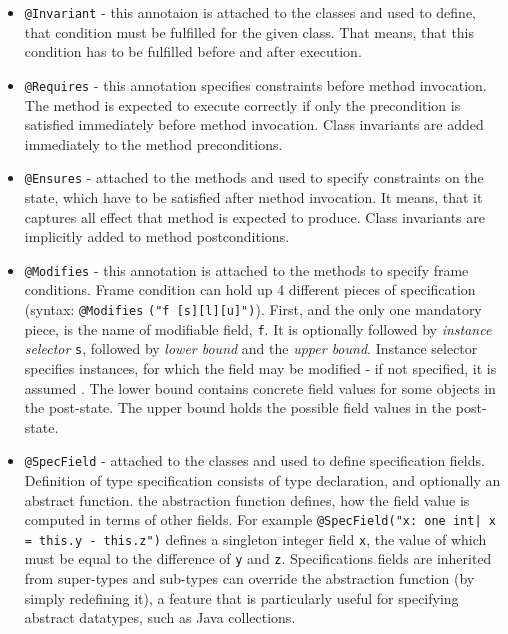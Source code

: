\documentclass[11pt,twoside,a4paper]{book}
\begin{document}
\begin{itemize}
  \item \verb|@Invariant| - this annotaion is attached to the classes and used
  to define, that condition must be fulfilled for the given class. That means,
  that this condition has to be fulfilled before and after execution.
  
  \item \verb|@Requires| -  this annotation specifies constraints before method
  invocation. The method is expected to execute correctly if only the
  precondition is satisfied immediately before method invocation. Class
  invariants are added immediately to the method preconditions.
  \newpage
  \item \verb|@Ensures| - attached to the methods and used to specify
  constraints on the state, which have to be satisfied after method invocation.
  It means, that it captures all effect that method is expected to produce.
  Class invariants are implicitly added to method postconditions.
  
  \item  \verb|@Modifies| - this annotation is attached to the methods to
  specify frame conditions. Frame condition can hold up 4 different pieces of
  specification (syntax: \verb|@Modifies| \verb|("f [s][l][u]")|). First, and
  the only one mandatory piece, is the name of modifiable field, \verb|f|. It is
  optionally followed by \textit{instance selector} \verb|s|, followed by
  \textit{lower bound} and the \textit{upper bound}. Instance selector specifies
  instances, for which the field may be modified - if not specified, it is
  assumed . The lower bound contains concrete field values for some
  objects in the post-state. The upper bound holds the possible field values in
  the post-state.
  
  \item \verb|@SpecField| - attached to the classes and used to define
  specification fields. Definition of type specification consists of type
  declaration, and optionally an abstract function. the abstraction function
  defines, how the field value is computed in terms of other fields. For example
  \verb#@SpecField("x: one int| x = this.y - this.z")#  defines a singleton
  integer field \verb|x|, the value of which must be equal to the difference of
  \verb|y| and \verb|z|. Specifications fields are inherited from super-types
  and sub-types can override the abstraction function (by simply redefining
  it), a feature that is particularly useful for specifying abstract datatypes,
  such as Java collections.
  
  

  
\end{itemize}
\end{document}
